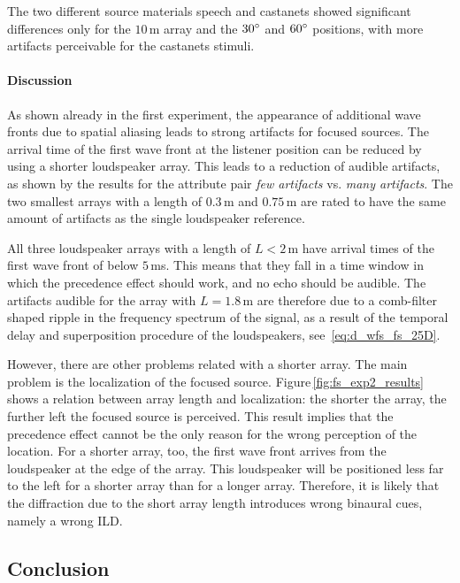 The two different source materials speech and castanets showed significant
differences only for the $10$\,m array and the $30^\circ$ and $60^\circ$
positions, with more artifacts perceivable for the castanets stimuli.


\paragraph{Discussion}
As shown already in the first experiment, the appearance of additional wave
fronts due to spatial aliasing leads to strong artifacts for focused sources.
The arrival time of the first wave front at the
listener position can be reduced by using a shorter loudspeaker array.  This
leads to a reduction of audible artifacts, as shown by the results for the
attribute pair \emph{few artifacts} vs. \emph{many artifacts}.  The two smallest
arrays with a length of $0.3$\,m and $0.75$\,m are rated to have the same amount
of artifacts as the single loudspeaker reference.

All three loudspeaker arrays with a length of $L<2$\,m have arrival times of the
first wave front of below $5$\,ms. This means that they fall in a time window in
which the precedence effect should work, and no echo should be audible.  The
artifacts audible for the array with $L = 1.8$\,m are therefore due to a
comb-filter shaped ripple in the frequency spectrum of the signal, as a result
of the temporal delay and superposition procedure of the loudspeakers,
see~\eqref{eq:d_wfs_fs_25D}.

However, there are other problems related with a shorter array.  The main
problem is the localization of the focused source.
Figure\,\ref{fig:fs_exp2_results} shows a relation between array length
and localization: the shorter the array, the further left the focused source
is perceived.  This result implies that the precedence effect cannot be the only
reason for the wrong perception of the location. For a shorter array, too, the
first wave front arrives from the loudspeaker at the edge of the array. This
loudspeaker will be positioned less far to the left for a shorter array than for
a longer array.  Therefore, it is likely that the diffraction due to the short
array length introduces wrong binaural cues, namely a wrong ILD.


\subsection{Conclusion}
\label{sec:fs_conclusion}

